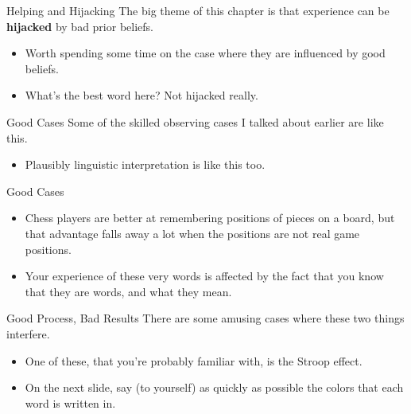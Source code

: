 \documentclass[
  17pt,
  letterpaper,
  ignorenonframetext,
  aspectratio=169,
  xcolor={dvipsnames}]{beamer}
\providecommand{\tightlist}{%
  \setlength{\itemsep}{0pt}\setlength{\parskip}{0pt}}\usepackage{longtable,booktabs,array}
\begin{document}
\begin{frame}{Helping and Hijacking}
\protect\hypertarget{helping-and-hijacking-1}{}
The big theme of this chapter is that experience can be
\textbf{hijacked} by bad prior beliefs.

\begin{itemize}[<+->]
\tightlist
\item
  Worth spending some time on the case where they are influenced by good
  beliefs.
\item
  What's the best word here? Not hijacked really.
\end{itemize}
\end{frame}

\begin{frame}{Good Cases}
\protect\hypertarget{good-cases}{}
Some of the skilled observing cases I talked about earlier are like
this.

\begin{itemize}[<+->]
\tightlist
\item
  Plausibly linguistic interpretation is like this too.
\end{itemize}
\end{frame}

\begin{frame}{Good Cases}
\protect\hypertarget{good-cases-1}{}
\begin{itemize}[<+->]
\tightlist
\item
  Chess players are better at remembering positions of pieces on a
  board, but that advantage falls away a lot when the positions are not
  real game positions.
\item
  Your experience of these very words is affected by the fact that you
  know that they are words, and what they mean.
\end{itemize}
\end{frame}

\begin{frame}{Good Process, Bad Results}
\protect\hypertarget{good-process-bad-results}{}
There are some amusing cases where these two things interfere.

\begin{itemize}[<+->]
\tightlist
\item
  One of these, that you're probably familiar with, is the Stroop
  effect.
\item
  On the next slide, say (to yourself) as quickly as possible the colors
  that each word is written in.
\end{itemize}
\end{frame}
\end{document}
